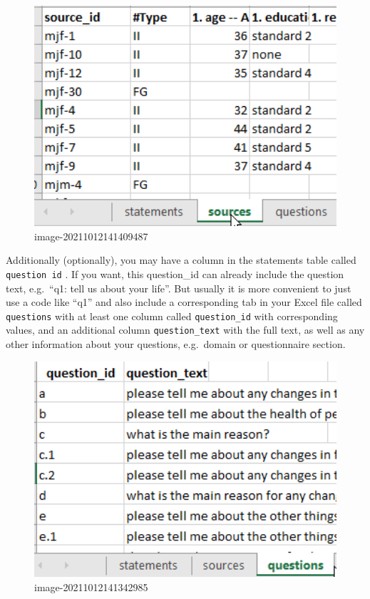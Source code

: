 \documentclass[
]{book}
\begin{document}
\begin{figure}
\centering
\includegraphics[width=6.77083in,height=\textheight]{_assets/image-20211012141409487.png}
\caption{image-20211012141409487}
\end{figure}

Additionally (optionally), you may have a column in the statements table called \texttt{question\ id} . If you want, this question\_id can already include the question text, e.g.~``q1: tell us about your life''. But usually it is more convenient to just use a code like ``q1'' and also include a corresponding tab in your Excel file called \texttt{questions} with at least one column called \texttt{question\_id} with corresponding values, and an additional column \texttt{question\_text} with the full text, as well as any other information about your questions, e.g.~domain or questionnaire section.

\begin{figure}
\centering
\includegraphics[width=6.77083in,height=\textheight]{_assets/image-20211012141342985.png}
\caption{image-20211012141342985}
\end{figure}
\end{document}
